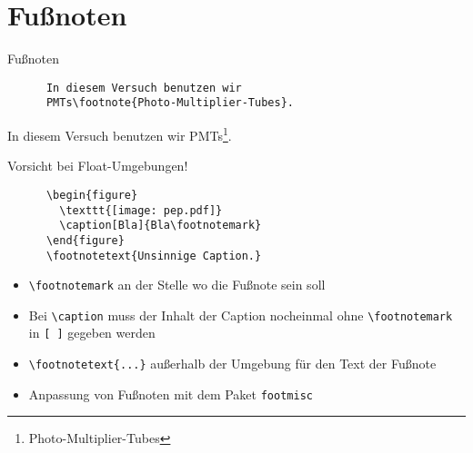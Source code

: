 \section{Fußnoten}

\begin{frame}[fragile]{Fußnoten}
  \begin{CodeExample}{0.5}
    \begin{lstlisting}
      In diesem Versuch benutzen wir
      PMTs\footnote{Photo-Multiplier-Tubes}.
    \end{lstlisting}
    \CodeResult
    In diesem Versuch benutzen wir PMTs\footnote{Photo-Multiplier-Tubes}.
  \end{CodeExample}

  \begin{alertblock}{Vorsicht bei Float-Umgebungen!}
    \begin{lstlisting}
      \begin{figure}
        \texttt{[image: pep.pdf]}
        \caption[Bla]{Bla\footnotemark}
      \end{figure}
      \footnotetext{Unsinnige Caption.}
    \end{lstlisting}
  \end{alertblock}
  \vspace{-1pt}
  \begin{itemize}
    \item \lstinline+\footnotemark+ an der Stelle wo die Fußnote sein soll
    \item Bei \lstinline+\caption+ muss der Inhalt der Caption nocheinmal
        ohne \lstinline+\footnotemark+ in \lstinline+[ ]+ gegeben werden
    \item \lstinline+\footnotetext{...}+ außerhalb der Umgebung für den Text der Fußnote
    \item Anpassung von Fußnoten mit dem Paket \texttt{footmisc}
  \end{itemize}
\end{frame}

